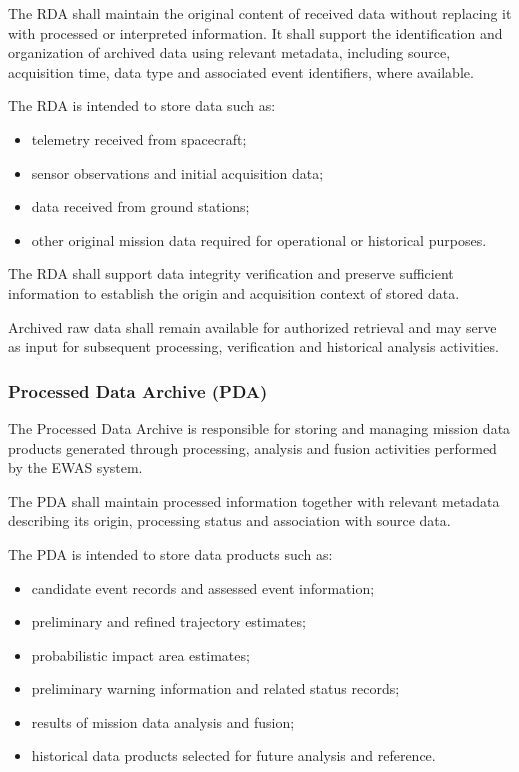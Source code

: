 The RDA shall maintain the original content of received data without replacing it with processed or interpreted information. It shall support the identification and organization of archived data using relevant metadata, including source, acquisition time, data type and associated event identifiers, where available.

The RDA is intended to store data such as:

\begin{itemize}
    \item telemetry received from spacecraft;
    \item sensor observations and initial acquisition data;
    \item data received from ground stations;
    \item other original mission data required for operational or historical purposes.
\end{itemize}

The RDA shall support data integrity verification and preserve sufficient information to establish the origin and acquisition context of stored data.

Archived raw data shall remain available for authorized retrieval and may serve as input for subsequent processing, verification and historical analysis activities.

\subsubsection*{Processed Data Archive (PDA)}

The Processed Data Archive is responsible for storing and managing mission data products generated through processing, analysis and fusion activities performed by the EWAS system.

The PDA shall maintain processed information together with relevant metadata describing its origin, processing status and association with source data.

The PDA is intended to store data products such as:

\begin{itemize}
    \item candidate event records and assessed event information;
    \item preliminary and refined trajectory estimates;
    \item probabilistic impact area estimates;
    \item preliminary warning information and related status records;
    \item results of mission data analysis and fusion;
    \item historical data products selected for future analysis and reference.
\end{itemize}

